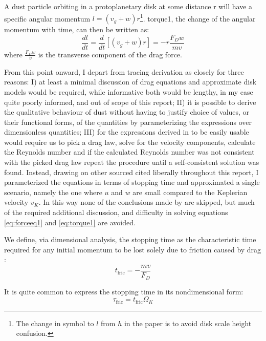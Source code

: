 \documentclass[12pt]{article}
\begin{document}
A dust particle orbiting in a protoplanetary disk at some distance r will have a specific angular momentum $l=(v_g + w)r$\footnote{The change in symbol to $l$ from $h$ in the paper is to avoid disk scale height confusion.}. torque1, the change of the angular momentum with time, can then be written as: 
\begin{equation}
    \label{eq:torque1} 
    \frac{dl}{dt} = \frac{d}{dt} \left[ (v_g+w)r \right] = -r\frac{F_D w}{mv}
\end{equation}
where $\frac{F_D w}{v}$ is the transverse component of the drag force.

From this point onward, I depart from tracing \citet{Weidenschilling77} derivation as closely for three reasons: I) at least a minimal discussion of drag equations and approximate disk models would be required, while informative both would be lengthy, in my case quite poorly informed, and out of scope of this report; II) it is possible to derive the qualitative behaviour of dust without having to justify choice of values, or their functional forms, of the quantities by parameterizing the expressions over dimensionless quantities; III) for the expressions derived in \citet{Weidenschilling77} to be easily usable would require us to pick a drag law, solve for the velocity components, calculate the Reynolds number and if the calculated Reynolds number was not consistent with the picked drag law repeat the procedure until a self-consistent solution was found. Instead, drawing on other sourced cited liberally throughout this report, I parameterized the equations in terms of stopping time and approximated a single scenario, namely the one where $u$ and $w$ are small compared to the Keplerian velocity $v_K$. In this way none of the conclusions made by \citet{Weidenschilling77} are skipped, but much of the required additional discussion, and difficulty in solving equations \ref{eq:forceeq1} and \ref{eq:torque1} are avoided.

 We define, via dimensional analysis, the stopping time as the characteristic time required for any initial momentum to be lost solely due to friction caused by drag \citep{Weidenschilling77}:
\begin{equation}
    t_{\mathrm{fric}} = -\frac{mv}{F_D} 
\end{equation}

It is quite common to express the stopping time in its nondimensional form: 
\begin{equation}
    \label{eq:nondimfric}
    \tau_{\mathrm{fric}} = t_{\mathrm{fric}}\Omega_K
\end{equation}
\end{document}
